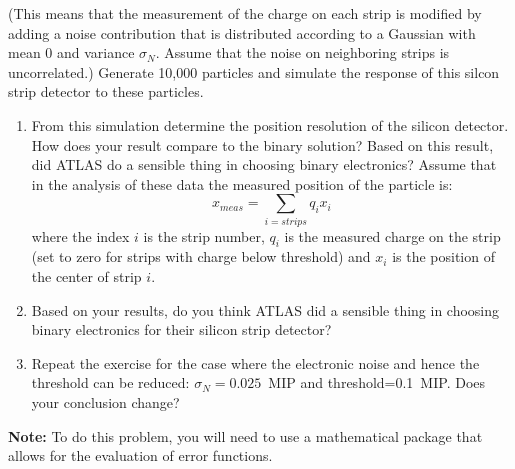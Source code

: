 \documentclass[12pt]{article}
\begin{document}
\begin{enumerate}
\begin{enumerate}
(This means that the measurement of the charge on each
strip is modified by adding a noise
contribution that is distributed according
to a Gaussian with mean 0 and variance $\sigma_N$.  Assume that the
noise on neighboring strips is uncorrelated.)
Generate 10,000 particles and simulate the response of this
silcon strip detector to these particles.
\begin{enumerate}
\item From this simulation
determine the position resolution of the silicon detector.
How does your result compare to the binary solution?  Based on this result,
did ATLAS do a sensible thing in choosing binary electronics?  
Assume that in the analysis of these data  
the measured position 
of the particle is:
$$
x_{meas} = \sum_{i=strips} q_i x_i
$$
where the index $i$ is the strip number, $q_i$ is the measured
charge on the strip (set to zero for strips with charge below
threshold) and $x_i$ is the position of the center of strip $i$.
\item Based on your results, do you think ATLAS did a sensible thing in choosing
  binary electronics for their silicon strip detector?
\item Repeat the exercise for the case where the electronic noise and hence the
  threshold can be reduced: $\sigma_N=0.025$~MIP and threshold=0.1~MIP.  Does your conclusion change?
\end{enumerate}
{\bf Note:}  To do this problem, you will need to use a mathematical package
that allows for the evaluation of error functions.
\end{enumerate}
\end{enumerate}
\end{document}

